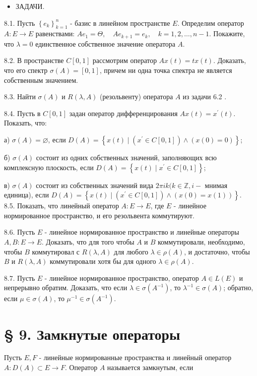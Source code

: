 \begin{itemize}
  \item ЗАДАЧИ.
\end{itemize}

8.1. Пусть $\left\{e_{k}\right\}_{k=1}^{n}$ - базис в линейном пространстве $E$. Определим оператор $A: E \rightarrow E$ равенствами: $A e_{1}=\Theta, \quad A e_{k+1}=e_{k}, \quad k=1,2, \ldots, n-1$. Покажите, что $\lambda=0$ единственное собственное значение оператора $A$.

8.2. В пространстве $C[0,1]$ рассмотрим оператор $A x(t)=t x(t)$. Доказать, что его спектр $\sigma(A)=[0,1]$, причем ни одна точка спектра не является собственным значением.

8.3. Найти $\sigma(A)$ и $R(\lambda, A)$ (резольвенту) оператора $A$ из задачи 6.2 .

8.4. Пусть в $C[0,1]$ задан оператор дифференцирования $A x(t)=x^{\prime}(t)$. Показать, что:

а) $\sigma(A)=\varnothing$, если $D(A)=\left\{x(t) \mid\left(x^{\prime} \in C[0,1]\right) \wedge(x(0)=0)\right\}$;

б) $\sigma(A)$ состоит из одних собственных значений, заполняющих всю комплексную плоскость, если $D(A)=\left\{x(t) \mid x^{\prime} \in C[0,1]\right\}$;

в) $\sigma(A)$ состоит из собственных значений вида $2 \pi i k(k \in \mathbb{Z}, i-$ мнимая единица), если $D(A)=\left\{x(t) \mid\left(x^{\prime} \in C[0,1]\right) \wedge(x(0)=x(1))\right\}$. 8.5. Показать, что линейный оператор $A: E \rightarrow E$, где $E$ - линейное нормированное пространство, и его резольвента коммутируют.

8.6. Пусть $E$ - линейное нормированное пространство и линейные операторы $A, B: E \rightarrow E$. Доказать, что для того чтобы $A$ и $B$ коммутировали, необходимо, чтобы $B$ коммутировал с $R(\lambda, A)$ для любого $\lambda \in \rho(A)$, и достаточно, чтобы $B$ и $R(\lambda, A)$ коммутировали хотя бы для одного $\lambda \in \rho(A)$.

8.7. Пусть $E$ - линейное нормированное пространство, оператор $A \in L(E)$ и непрерывно обратим. Доказать, что если $\lambda \in \sigma\left(A^{-1}\right)$, то $\lambda^{-1} \in \sigma(A)$; обратно, если $\mu \in \sigma(A)$, то $\mu^{-1} \in \sigma\left(A^{-1}\right)$.

\section*{§ 9. Замкнутые операторы}
Пусть $E, F$ - линейные нормированные пространства и линейный оператор $A: D(A) \subset E \rightarrow F$. Оператор $A$ называется замкнутым, если 

